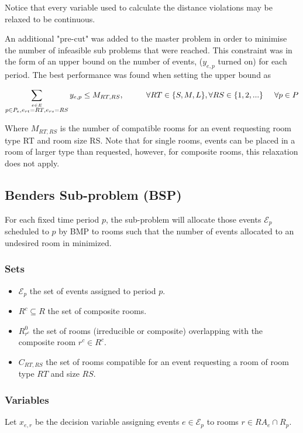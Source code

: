 \documentclass{article}
\newcommand{\E}{\mathcal{E}}
\begin{document}
Notice that every variable used to calculate the distance violations may be
relaxed to be continuous. \medbreak

An additional "pre-cut" was added to the master problem in order to minimise the number of infeasible sub problems that were reached. This constraint was in the form of an upper bound on the number of events, ($y_{e, p}$ turned on) for each period. The best performance was found when setting the upper bound as

\begin{equation}
    \sum_{\stackrel{e\in E}{p \in P_{e}, e_{rt} = RT, e_{rs} = RS}} y_{e, p} \le M_{RT, RS}, \hspace{1cm} \forall RT \in \{S, M, L\}, \forall RS \in \{1,2,...\} \hspace{0.5cm} \forall p\in P
\end{equation}

Where $M_{RT, RS}$ is the number of compatible rooms for an event requesting room type RT and room size RS. Note that for single rooms, events can be placed in a room of larger type than requested, however, for composite rooms, this relaxation does not apply.

\bigbreak

\subsection{Benders Sub-problem (BSP)} \label{BSP}
For each fixed time period $p$, the sub-problem will allocate those events $\E_p$ scheduled to $p$ by BMP to rooms such that the number of events allocated to an undesired room in minimized.

\subsubsection*{Sets}
\begin{itemize}
    \item $\E_p$ the set of events assigned to period $p$.
    \item $R^c \subseteq R$ the set of composite rooms.
    \item $R^0_{r^c}$ the set of rooms (irreducible or composite) overlapping with the composite room $r^c \in R^c$.
    \item $C_{RT, RS}$ the set of rooms compatible for an event requesting a room of room type $RT$ and size $RS$.
\end{itemize}

\subsubsection*{Variables}
Let $x_{e,r}$ be the decision variable assigning events $e \in \E_p$ to rooms $r
\in RA_e \cap R_p$. \medbreak
\end{document}
